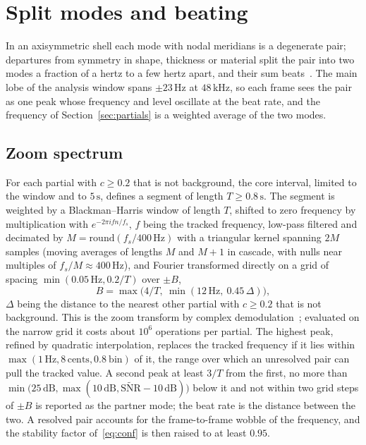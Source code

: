 \documentclass[10pt,a4paper,twocolumn]{article}
\newcommand{\Hz}{\,\mathrm{Hz}}
\newcommand{\dB}{\,\mathrm{dB}}
\newcommand{\s}{\,\mathrm{s}}
\newcommand{\ct}{\,\mathrm{cents}}
\begin{document}
\section{Split modes and beating}
\label{sec:split}

In an axisymmetric shell each mode with nodal meridians is a degenerate pair; departures from symmetry in shape, thickness or material split the pair into two modes a fraction of a hertz to a few hertz apart, and their sum beats~\cite{FletcherRossing,Inacio,Terwagne}. The main lobe of the analysis window spans $\pm 23\Hz$ at $48\,\mathrm{kHz}$, so each frame sees the pair as one peak whose frequency and level oscillate at the beat rate, and the frequency of Section~\ref{sec:partials} is a weighted average of the two modes.

\subsection{Zoom spectrum}

For each partial with $c \ge 0.2$ that is not background, the core interval, limited to the window and to $5\s$, defines a segment of length $T \ge 0.8\s$. The segment is weighted by a Blackman--Harris window of length $T$, shifted to zero frequency by multiplication with $e^{-2\pi i f n/f_s}$, $f$ being the tracked frequency, low-pass filtered and decimated by $M = \mathrm{round}(f_s/400\Hz)$ with a triangular kernel spanning $2M$ samples (moving averages of lengths $M$ and $M+1$ in cascade, with nulls near multiples of $f_s/M \approx 400\Hz$), and Fourier transformed directly on a grid of spacing $\min(0.05\Hz, 0.2/T)$ over $\pm B$,
\begin{equation}
B = \max\bigl(4/T,\ \min(12\Hz,\ 0.45\,\Delta)\bigr),
\end{equation}
$\Delta$ being the distance to the nearest other partial with $c \ge 0.2$ that is not background. This is the zoom transform by complex demodulation~\cite{Yip,Randall}; evaluated on the narrow grid it costs about $10^6$ operations per partial. The highest peak, refined by quadratic interpolation, replaces the tracked frequency if it lies within $\max(1\Hz, 8\ct, 0.8\ \text{bin})$ of it, the range over which an unresolved pair can pull the tracked value. A second peak at least $3/T$ from the first, no more than $\min\bigl(25\dB, \max(10\dB, \widetilde{\mathrm{SNR}} - 10\dB)\bigr)$ below it and not within two grid steps of $\pm B$ is reported as the partner mode; the beat rate is the distance between the two. A resolved pair accounts for the frame-to-frame wobble of the frequency, and the stability factor of~\eqref{eq:conf} is then raised to at least $0.95$.
\end{document}
